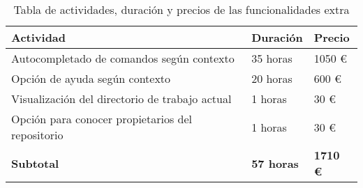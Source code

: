 \begin{table}[!ht]
\begin{center}
\begin{tabular}{|p{80mm}|p{25mm}|p{20mm}|} \hline 
\textbf{Actividad} & \textbf{Duración} & \textbf{Precio} \\ \hline

Autocompletado de comandos según contexto &
35 horas &
1050 \euro{}
\\
\hline

Opción de ayuda según contexto &
20 horas &
600 \euro{}
\\
\hline

Visualización del directorio de trabajo actual &
1 horas &
30 \euro{}
\\
\hline

Opción para conocer propietarios del repositorio &
1 horas &
30 \euro{}
\\
\hline \hline

{\bfseries Subtotal} &
{\bfseries 57 horas} &
{\bfseries 1710 \euro{}}
\\
\hline

\end{tabular}
\end{center}
\caption{Tabla de actividades, duración y precios de las funcionalidades extra}
\label{table:resOthers2}
\end{table}

